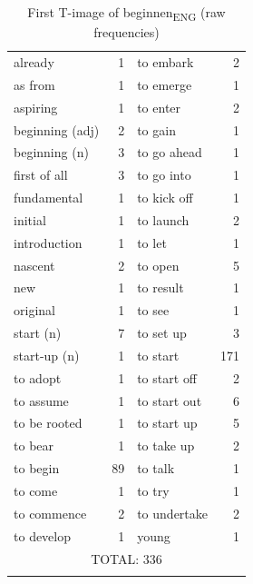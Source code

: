 \begin{table}
\caption{First T-image of beginnen\textsubscript{ENG} (raw frequencies)\label{tab:3:5}}
\begin{tabular}{lr@{\hspace{5em}}lr} 
\lsptoprule
\multicolumn{4}{c}{beginnen}\\\midrule      
{already} &  1            &             {to} {embark} &  2\\
{as} {from} &  1          &           {to} {emerge} &  1\\
{aspiring} &  1           &            {to} {enter} &  2\\
{beginning} {(adj)} &  2  &   {to} {gain} &  1\\
{beginning} {(n)} &  {3}  &   {to} {go} {ahead} &  1\\
{first} {of} {all} &  {3} &  {to} {go} {into} &  1\\
{fundamental} &  1        &         {to} {kick} {off} &  1\\
{initial} &  1            &             {to} {launch} &  2\\
{introduction} &  1       &        {to} {let} &  1\\
{nascent} &  2            &             {to} {open} &  {5}\\
{new} &  1                &                 {to} {result} &  1\\
{original} &  1           &            {to} {see} &  1\\
{start} {(n)} &  {7}      &       {to} {set} {up} &  {3}\\
{start-up} {(n)} &  1     &      {to} {start} &  {171}\\
{to} {adopt} &  1         &          {to} {start} {off} &  2\\
{to} {assume} &  1        &         {to} {start} {out} &  {6}\\
{to} {be} {rooted} &  1   &    {to} {start} {up} &  {5}\\
{to} {bear} &  1          &           {to} {take} {up} &  2\\
{to} {begin} &  {89}      &       {to} {talk} &  1\\
{to} {come} &  1          &           {to} {try} &  1\\
{to} {commence} &  2      &       {to} {undertake} &  2\\
{to} {develop} &  1       &        {young} &  1\\ \midrule
\multicolumn{4}{c}{TOTAL: 336}\\
\lspbottomrule
\end{tabular}
\end{table}

